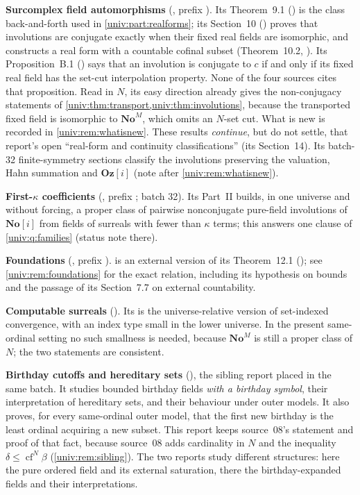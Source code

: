 \documentclass[11pt,letterpaper]{article}
\numberwithin{equation}{section}
\theoremstyle{definition}
\theoremstyle{remark}
\newcommand{\No}{\mathbf{No}}
\newcommand{\NoM}{\No^{M}}
\newcommand{\cf}{\operatorname{cf}}
\begin{document}
\textbf{Surcomplex field automorphisms}
(, prefix
). Its Theorem~9.1 () is the
class back-and-forth used in \cref{univ:part:realforms}; its Section~10
() proves that involutions are conjugate exactly
when their fixed real fields are isomorphic, and constructs a real form with a
countable cofinal subset (Theorem~10.2, ).
Its Proposition~B.1 () says that an
involution is conjugate to $c$ if and only if its fixed real field has the
set-cut interpolation property. None of the four sources cites that
proposition. Read in $N$, its easy direction already gives the non-conjugacy
statements of \cref{univ:thm:transport,univ:thm:involutions}, because the
transported fixed field is isomorphic to $\NoM$, which omits an $N$-set cut.
What is new is recorded in \cref{univ:rem:whatisnew}. These results
\emph{continue}, but do not settle, that report's open ``real-form and
continuity classifications'' (its Section~14). Its batch-32 finite-symmetry
sections classify the involutions preserving the valuation, Hahn summation and
$\mathbf{Oz}[i]$ (note after \cref{univ:rem:whatisnew}).

\textbf{First-$\kappa$ coefficients}
(, prefix ; batch 32).
Its Part~II builds, in one universe and without forcing, a proper class of
pairwise nonconjugate pure-field involutions of $\No[i]$ from fields of surreals
with fewer than $\kappa$ terms; this answers one clause of
\cref{univ:q:families} (status note there).

\textbf{Foundations} (,
prefix ).  is an external version of
its Theorem~12.1 (); see \cref{univ:rem:foundations}
for the exact relation, including its hypothesis on bounds and the passage
of its Section~7.7 on external countability.

\textbf{Computable surreals}
(). Its
 is the universe-relative version of set-indexed
convergence, with an index type small in the lower universe. In the present
same-ordinal setting no such smallness is needed, because $\NoM$ is still a
proper class of $N$; the two statements are consistent.

\textbf{Birthday cutoffs and hereditary sets}
(),
the sibling report placed in the same batch. It studies bounded birthday
fields \emph{with a birthday symbol}, their interpretation of hereditary sets,
and their behaviour under outer models. It also proves, for every same-ordinal
outer model, that the first new birthday is the least ordinal acquiring a new
subset. This report keeps source~08's statement and proof of that fact,
because source~08 adds cardinality in $N$ and the inequality
$\delta\le\cf^N\beta$ (\cref{univ:rem:sibling}). The two reports study
different structures: here the pure ordered field and its external
saturation, there the birthday-expanded fields and their interpretations.
\end{document}
